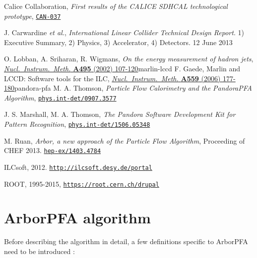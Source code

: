 \documentclass[cits]{JINST}
\begin{document}
\newpage
\begin{thebibliography}{6}
\renewcommand{\hepex}[1]{\href{http://www.arxiv.org/abs/#1}{\tt hep-ex/#1}}
\renewcommand{\physics}[1]{\href{http://www.arxiv.org/abs/#1}{\tt phys.int-det/#1}}
\newcommand\nim[4]{\href{http://dx.doi.org/10.1016/#4}
  {\emph{Nucl.\ Instrum.\ Meth.} {\bf #1} (#2) #3}}
\newcommand\can[1]{\href{https://twiki.cern.ch/twiki/pub/CALICE/CaliceAnalysisNotes/CAN-#1.pdf}{\tt CAN-#1}}


Calice Collaboration, \emph{First results of the CALICE SDHCAL technological prototype}, \can{037}

J. Carwardine {\it et al.},  \emph{International Linear Collider Technical Design Report}. 1) Executive Summary, 2) Physics, 3) Accelerator, 4) Detectors. 12 June 2013

O. Lobban, A. Sriharan, R. Wigmans,  \emph{On the energy measurement of hadron jets}, \nim{A495}{2002}{107-120}

\bibitem{marlin-lccd}
F. Gaede, Marlin and LCCD: Software tools for the ILC, \nim{A559}{2006}{177-180}

\bibitem{pandora-pfa}
M. A. Thomson, \emph{Particle Flow Calorimetry and the PandoraPFA Algorithm}, \physics{0907.3577}

J. S. Marshall, M. A. Thomson, \emph{The Pandora Software Development Kit for Pattern Recognition}, \physics{1506.05348}

M. Ruan, \emph{Arbor, a new approach of the Particle Flow Algorithm}, Proceeding of CHEF 2013. \hepex{1403.4784}

ILCsoft, 2012. \href{http://ilcsoft.desy.de/portal}{\tt http://ilcsoft.desy.de/portal}

ROOT, 1995-2015, \href{https://root.cern.ch/drupal}{\tt https://root.cern.ch/drupal}

\newpage

\end{thebibliography}


\clearpage
\appendix

\section{ArborPFA algorithm}
\label{ARBOR_ALGO_DESCRIPTION}

Before describing the algorithm in detail, a few definitions specific to ArborPFA need to be introduced :
\end{document}
